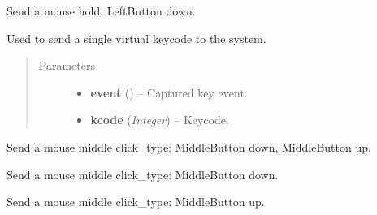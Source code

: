 \documentclass[letterpaper,10pt,english]{sphinxmanual}
\begin{document}

\begin{fulllineitems}
\label{macro:macro.hold}
Send a mouse hold: LeftButton down.

\end{fulllineitems}


\begin{fulllineitems}
\label{macro:macro.key_press}
Used to send a single virtual keycode to the system.
\begin{quote}\begin{description}
\item[{Parameters}] \leavevmode\begin{itemize}
\item {} 
\textbf{event} () -- Captured key event.

\item {} 
\textbf{kcode} (\emph{Integer}) -- Keycode.

\end{itemize}

\end{description}\end{quote}

\end{fulllineitems}


\begin{fulllineitems}
\label{macro:macro.middle_click}
Send a mouse middle click\_type: MiddleButton down, MiddleButton up.

\end{fulllineitems}


\begin{fulllineitems}
\label{macro:macro.middle_hold}
Send a mouse middle click\_type: MiddleButton down.

\end{fulllineitems}


\begin{fulllineitems}
\label{macro:macro.middle_release}
Send a mouse middle click\_type: MiddleButton up.

\end{fulllineitems}
\end{document}
